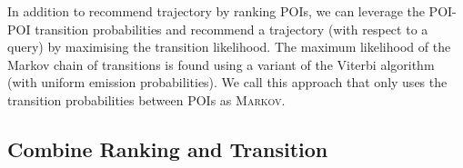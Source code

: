 
In addition to recommend trajectory by ranking POIs, we can leverage the POI-POI transition probabilities and
recommend a trajectory (with respect to a query) by maximising the transition likelihood.
The maximum likelihood of the Markov chain of transitions is found using a variant of the Viterbi algorithm (with uniform emission probabilities).
We call this approach that only uses the transition probabilities between POIs as \textsc{Markov}.



\secmoveup
\subsection{Combine Ranking and Transition}
\label{sec:rank+markov}



